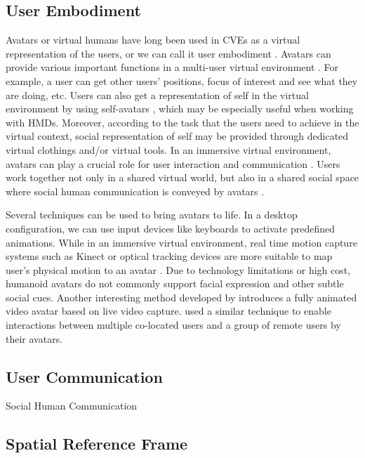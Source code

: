 \subsection{User Embodiment}
Avatars or virtual humans have long been used in CVEs as a virtual representation of the users, or we can call it user embodiment \citep{Benford1995UEC}. Avatars can provide various important functions in a multi-user virtual environment \citep{Thalmann2001VHR}. For example, a user can get other users' positions, focus of interest and see what they are doing, etc. Users can also get a representation of self in the virtual environment by using self-avatars \citep{Lok2003Effects}, which may be especially useful when working with HMDs. Moreover, according to the task that the users need to achieve in the virtual context, social representation of self may be provided through dedicated virtual clothings and/or virtual tools. In an immersive virtual environment, avatars can play a crucial role for user interaction and communication \citep{Slater1994Body}. Users work together not only in a shared virtual world, but also in a shared social space where social human communication is conveyed by avatars \citep{Roberts2004SSH}.

Several techniques can be used to bring avatars to life. In a desktop configuration, we can use input devices like keyboards to activate predefined animations. While in an immersive virtual environment, real time motion capture systems such as Kinect or optical tracking devices are more suitable to map user's physical motion to an avatar \citep{Mohler2010Effect, Vera2011AugMir, Normand2012FBA}. Due to technology limitations or high cost, humanoid avatars do not commonly support facial expression and other subtle social cues. Another interesting method developed by \citet{Ogi2001SteAva} introduces a fully animated video avatar based on live video capture. \citet{Beck2013GGT} used a similar technique to enable interactions between multiple co-located users and a group of remote users by their avatars.

\subsection{User Communication}
Social Human Communication

\subsection{Spatial Reference Frame}

